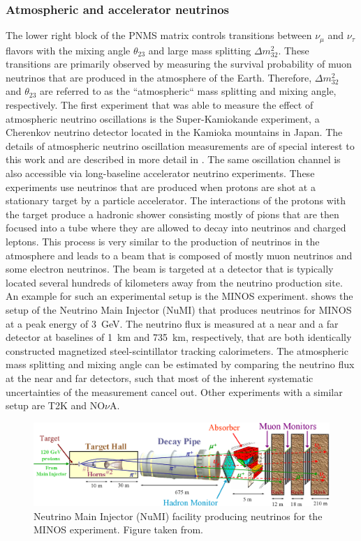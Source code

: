 \subsubsection{Atmospheric and accelerator neutrinos}
The lower right block of the PNMS matrix controls transitions between $\nu_\mu$ and $\nu_\tau$ flavors with the mixing angle $\theta_{23}$ and large mass splitting $\Delta m^2_{32}$. These transitions are primarily observed by measuring the survival probability of muon neutrinos that are produced in the atmosphere of the Earth. Therefore, $\Delta m^2_{32}$ and $\theta_{23}$ are referred to as the ``atmospheric`` mass splitting and mixing angle, respectively. The first experiment that was able to measure the effect of atmospheric neutrino oscillations is the Super-Kamiokande experiment\cite{PhysRevLett.81.1562}, a Cherenkov neutrino detector located in the Kamioka mountains in Japan. The details of atmospheric neutrino oscillation measurements are of special interest to this work and are described in more detail in . The same oscillation channel is also accessible via long-baseline accelerator neutrino experiments. These experiments use neutrinos that are produced when protons are shot at a stationary target by a particle accelerator. The interactions of the protons with the target produce a hadronic shower consisting mostly of pions that are then focused into a tube where they are allowed to decay into neutrinos and charged leptons. This process is very similar to the production of neutrinos in the atmosphere and leads to a beam that is composed of mostly muon neutrinos and some electron neutrinos. The beam is targeted at a detector that is typically located several hundreds of kilometers away from the neutrino production site. An example for such an experimental setup is the MINOS experiment\cite{MICHAEL2008190}.  shows the setup of the Neutrino Main Injector (NuMI) that produces neutrinos for MINOS at a peak energy of \SI{3}{GeV}. The neutrino flux is measured at a near and a far detector at baselines of \SI{1}{km} and \SI{735}{km}, respectively, that are both identically constructed magnetized steel-scintillator tracking calorimeters. The atmospheric mass splitting and mixing angle can be estimated by comparing the neutrino flux at the near and far detectors, such that most of the inherent systematic uncertainties of the measurement cancel out. Other experiments with a similar setup are T2K\cite{T2K:2011qtm} and NO$\nu$A\cite{Patterson:2012zs}.
\begin{figure}
    \centering
    \includegraphics{figures/theory/numi_beam.png}
    \caption{Neutrino Main Injector (NuMI) facility producing neutrinos for the MINOS experiment. Figure taken from\cite{osti_879065}.\label{fig:numi-beam}}
\end{figure}

